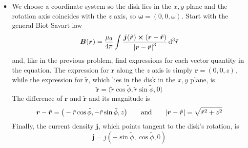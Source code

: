 \documentclass[11pt, a4paper]{article}
\newcommand{\diff}{\mathop{}\!\mathrm{d}} %
\newcommand{\eqtext}[1]{\qquad \text{#1} \qquad}
\renewcommand{\vec}[1]{\bm{#1}} %
\newcommand{\tvec}[1]{\tilde{\vec{#1}}} %
\renewcommand{\t}[1]{\tilde{#1}} %
\renewcommand{\r}{\vec{r}}
\newcommand{\B}{\vec{B}}  %
\begin{document}
\begin{itemize}
	\item We choose a coordinate system so the disk lies in the $ x, y $ plane and the rotation axis coincides with the $ z $ axis, so $ \bm{\omega} = (0, 0, \omega) $. Start with the general Biot-Savart law
	\begin{equation*}
		\B (\r) = \frac{\mu_{0}}{4\pi}\int \frac{\vec{j}(\tvec{r}) \cross (\r - \tvec{r})}{\abs{\r - \tvec{r}}^{3}} \diff^{3}\tilde{r}
	\end{equation*}
	and, like in the previous problem, find expressions for each vector quantity in the equation. The expression for $ \r $ along the $ z $ axis is simply $ \r = (0, 0, z) $, while the expression for $ \tvec{r} $, which lies in the disk in the $ x, y $ plane, is
	\begin{equation*}
		\tvec{r} = \big(\tilde{r} \cos \tilde{\phi}, \tilde{r} \sin \tilde{\phi}, 0 \big)
	\end{equation*}
	The difference of $ \r $ and $ \tvec{r} $ and its magnitude is
	\begin{equation*}
		\r - \tvec{r} = \big(-\tilde{r} \cos \tilde{\phi}, - \tilde{r} \sin \tilde{\phi}, z \big) \eqtext{and} \abs{\r - \tvec{r}} = \sqrt{\tilde{r}^{2} + z^{2}}
	\end{equation*}
	Finally, the current density $ \vec{j} $, which points tangent to the disk's rotation, is
	\begin{equation*}
		\vec{j} = j(-\sin \t{\phi}, \cos \t{\phi},0 )
	\end{equation*}
	

\end{itemize}
\end{document}
